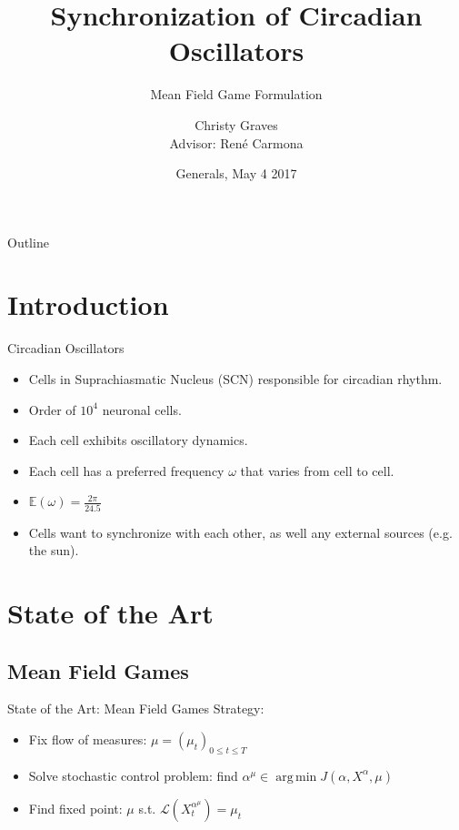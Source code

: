 \documentclass{beamer}
\title{Synchronization of Circadian Oscillators}
\subtitle{Mean Field Game Formulation}
\author[Christy Graves]{Christy Graves\\{\small Advisor: Ren\'{e} Carmona}}
\institute[Princeton University] %
{
	Program in Applied and Computational Mathematics\\
	Princeton University
}
\date{Generals, May 4 2017}
\DeclareMathOperator*{\argmin}{arg\,min}
\begin{document}
\begin{frame}
  \titlepage
\end{frame}

\begin{frame}{Outline}
  \tableofcontents
\end{frame}

\section{Introduction}

\begin{frame}{Circadian Oscillators}
	\begin{itemize}
		\item {
			Cells in Suprachiasmatic Nucleus (SCN) responsible for circadian rhythm.
		}
		\item Order of $10^4$ neuronal cells.
		\item Each cell exhibits oscillatory dynamics.
		\item Each cell has a preferred frequency $\omega$ that varies from cell to cell.
		\item $\mathbb{E}(\omega)=\frac{2\pi}{24.5}$
		\item Cells want to synchronize with each other, as well any external sources (e.g. the sun).
	\end{itemize}
\end{frame}

\section{State of the Art}

\subsection{Mean Field Games}

\begin{frame}{State of the Art: Mean Field Games}
	Strategy:
	\begin{itemize}
				\item {
					Fix flow of measures: $\mu=(\mu_t)_{0 \leq t \leq T}$
				}
				\item {
					Solve stochastic control problem: find $\alpha^{\mu} \in \argmin J(\alpha,X^{\alpha},\mu)$
				}
				\item {
					Find fixed point: $\mu$ s.t. $\mathcal{L}(X_t^{\alpha^{\mu}})=\mu_t$
				}
	\end{itemize}
\end{frame}
\end{document}
